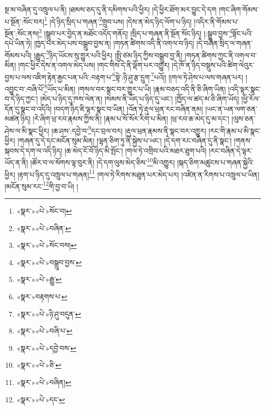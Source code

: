 སྔ་མ་བཞིན་དུ་འཁྲུལ་པ་ནི། །ཐམས་ཅད་དུ་ནི་དམིགས་པའི་ཕྱིར། །དེ་ཕྱིར་ཐོག་མར་བྱུང་དེ་དག །གང་ཞིག་གོམས་པ་སྔོན་:སོང་བར།\footnote{«སྣར་»«པེ་»སོང་བ།} །དེ་ཉིད་སྲིད་པ་གཞན་\footnote{«སྣར་»«པེ་»བཞིན་}གྲུབ་པས། །དེས་ན་མེད་ཉིད་ལོག་པ་ཉིད། །འདིར་ནི་གོམས་པ་སྔོན་:སོང་ནས།\footnote{«སྣར་»«པེ་»སོང་བས།} །སྒྲུབ་པར་བྱེད་ན་མཐོང་འདོད་གནོད། །སྲིད་པ་གཞན་ནི་སྔོན་སོང་ཉིད། །:སྒྲུབ་བྱས་\footnote{«སྣར་»«པེ་»བསྒྲུབ་བྱས་}སྟོང་པའི་དཔེ་ཡིན་ཏེ། །ཁྱད་པར་མེད་པས་བསྒྲུབ་བྱས་ན། །གཏན་ཚིགས་འདི་ནི་འགལ་བ་ཉིད། །དེ་བཞིན་སྲིད་ལ་གཞན་གོམས་པའི། །རྒྱུད་\footnote{«སྣར་»«པེ་»རྒྱུ་}ཉིད་ཡོངས་སུ་གྱུར་པའི་ཕྱིར། །སྤྱི་ཙམ་ཉིད་ཀྱིས་བསྒྲུབ་བྱ་ནི། །གཏན་ཚིགས་ཀྱང་ནི་འགལ་བ་མིན། །གང་ཕྱིར་དེས་ན་འགལ་མེད་པས། །གང་གིས་དེ་ནི་ལྡོག་པར་འགྱུར། །དེ་ཁོ་ན་ཉིད་བསྡུས་པའི་ཚིག་ལེའུར་བྱས་པ་ལས་འཇིག་རྟེན་རྒྱང་པན་པའི་:བརྟག་པ་\footnote{«སྣར་»བརྟགས་པ་}སྟེ་:ཉི་ཤུ་རྩ་དྲུག་\footnote{«སྣར་»«པེ་»ཉི་ཤུ་བདུན་}པའོ།། །།གལ་ཏེ་ཤེས་པ་ལས་གཞན་པར། །འབྱུང་བ་:བཞི་པོ་\footnote{«སྣར་»«པེ་»བཞི་པ་}ཡོད་པ་མིན། །གསལ་བར་སྣང་བར་གྱུར་པ་ཡི། །རྣམ་བཅད་འདི་ནི་ཅི་ཞིག་ཡིན། །འདི་ལྟར་སྣང་བ་དེ་ཉིད་ཀྱང་། །མེད་པ་ཉིད་དུ་ཁས་ལེན་ན། །སེམས་ནི་ཡོད་པ་ཉིད་དུ་ཡང་། །ཁྱོད་ལ་ཚད་མ་ཅི་ཞིག་ཡོད། །ཕྱི་རོལ་དོན་དུ་སྣང་བ་འདིའི། །བདག་ཉིད་ཇི་ལྟར་སྣང་བ་ཡིན། །འོན་ཏེ་རྡུལ་ཕྲན་རང་བཞིན་ནམ། །ཡང་ན་ཡན་ལག་ཅན་མཚན་ཉིད། །རེ་ཞིག་ཕྲ་རབ་རྣམས་ཀྱིས་ནི། །རྣམ་པ་སོ་སོར་རིག་པ་མིན། །ཕྲ་རབ་ཆ་མེད་དུ་མ་དང་། །ལུས་ཅན་ཤེས་ལ་མི་སྣང་ཕྱིར། །ཆ་ཤས་:དབྱེ་བ་\footnote{«སྣར་»«པེ་»དབྱེ་བས་}དང་བྲལ་བར། །རྡུལ་ཕྲན་རྣམས་ནི་སྣང་བར་འགྱུར། །རང་གི་རྣམ་པ་མི་སྣང་ཕྱིར། །གཞན་དུ་དེ་དང་མངོན་སུམ་མིན། །ལྷན་ཅིག་ཏུ་ནི་སྐྱེས་པ་ཡང་། །དེ་དག་རང་བཞིན་དུ་ནི་སྣང་། །གནས་སྐབས་དེ་དག་ལ་འདི་ཉིད། །ཆ་མེད་ངོ་བོ་ཉིད་མི་སྤོང་། །གལ་ཏེ་འགྲིབ་པའི་མཐར་ཐུག་པའི། །རང་བཞིན་དེ་ལྟར་ཡོད་ན་ནི། །ཚོར་བ་ལ་སོགས་ལྟ་བུར་ནི། །དེ་དག་ལུས་མེད་ཅིས་\footnote{«སྣར་»«པེ་»ཅི་}མི་འགྱུར། །སྐད་ཅིག་མཚུངས་པ་གཞན་སྐྱེའི་ཕྱིར། །རྟག་པ་ཉིད་དུ་འཁྲུལ་པ་གཞན།\footnote{«སྣར་»«པེ་»བཞིན།} །གལ་ཏེ་རིགས་མཐུན་པར་མེད་པར། །འཛིན་ན་རིགས་པ་འཁྲུལ་པ་ཡིན། །མངོན་སུམ་རང་\footnote{«སྣར་»«པེ་»དང་}གི་བྱ་བ་ཡི། །
